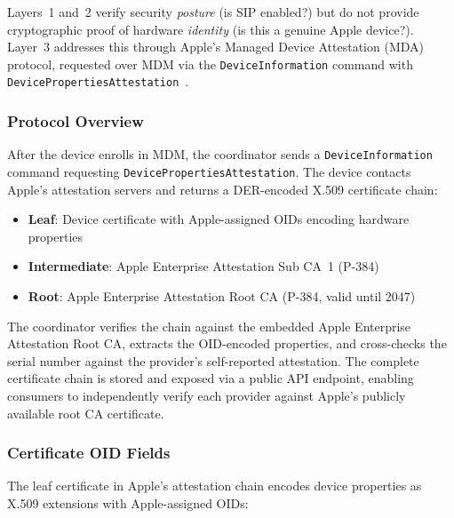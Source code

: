 \documentclass[10pt,twocolumn,letterpaper]{article}
\begin{document}
Layers~1 and~2 verify security \emph{posture} (is SIP enabled?) but do not provide cryptographic proof of hardware \emph{identity} (is this a genuine Apple device?). Layer~3 addresses this through Apple's Managed Device Attestation (MDA) protocol, requested over MDM via the \texttt{DeviceInformation} command with \texttt{DevicePropertiesAttestation}~\cite{apple-mda}.

\subsubsection{Protocol Overview}

After the device enrolls in MDM, the coordinator sends a \texttt{DeviceInformation} command requesting \texttt{DevicePropertiesAttestation}. The device contacts Apple's attestation servers and returns a DER-encoded X.509 certificate chain:
\begin{itemize}[leftmargin=*,itemsep=0pt]
    \item \textbf{Leaf}: Device certificate with Apple-assigned OIDs encoding hardware properties
    \item \textbf{Intermediate}: Apple Enterprise Attestation Sub CA~1 (P-384)
    \item \textbf{Root}: Apple Enterprise Attestation Root CA (P-384, valid until 2047)
\end{itemize}

The coordinator verifies the chain against the embedded Apple Enterprise Attestation Root CA, extracts the OID-encoded properties, and cross-checks the serial number against the provider's self-reported attestation. The complete certificate chain is stored and exposed via a public API endpoint, enabling consumers to independently verify each provider against Apple's publicly available root CA certificate.

\subsubsection{Certificate OID Fields}

The leaf certificate in Apple's attestation chain encodes device properties as X.509 extensions with Apple-assigned OIDs:
\end{document}
